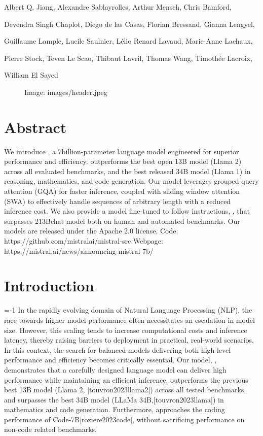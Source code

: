 \documentclass[11pt,a4paper]{article}
\begin{document}
Albert Q. Jiang, Alexandre Sablayrolles, Arthur Mensch, Chris Bamford, 

Devendra Singh Chaplot, Diego de las Casas, Florian Bressand, Gianna Lengyel,

Guillaume Lample, Lucile Saulnier, Lélio Renard Lavaud, Marie-Anne Lachaux, 

Pierre Stock, Teven Le Scao, Thibaut Lavril, Thomas Wang, Timothée Lacroix,

William El Sayed

\begin{figure}[h]
\caption{Image: images/header.jpeg}
\end{figure}

\section{Abstract}

We introduce , a 7billion-parameter language model engineered for superior performance and efficiency.
outperforms the best open 13B model (Llama 2) across all evaluated benchmarks, and the best released 34B model (Llama 1) in reasoning, mathematics, and code generation.
Our model leverages grouped-query attention (GQA) for faster inference, coupled with sliding window attention (SWA) to effectively handle sequences of arbitrary length with a reduced inference cost.
We also provide a model fine-tuned to follow instructions, , that surpasses 213Bchat model both on human and automated benchmarks.
Our models are released under the Apache 2.0 license.
Code: https://github.com/mistralai/mistral-src 
Webpage: https://mistral.ai/news/announcing-mistral-7b/

\section{Introduction}

=-1 In the rapidly evolving domain of Natural Language Processing (NLP), the race towards higher model performance often necessitates an escalation in model size.
However, this scaling tends to increase computational costs and inference latency, thereby raising barriers to deployment in practical, real-world scenarios.
In this context, the search for balanced models delivering both high-level performance and efficiency becomes critically essential.
Our model, , demonstrates that a carefully designed language model can deliver high performance while maintaining an efficient inference.
outperforms the previous best 13B model (Llama 2, [touvron2023llama2]) across all tested benchmarks, and surpasses the best 34B model (LLaMa 34B,[touvron2023llama]) in mathematics and code generation.
Furthermore, approaches the coding performance of Code-7B[roziere2023code], without sacrificing performance on non-code related benchmarks.
\end{document}
